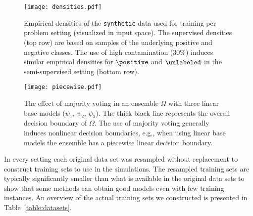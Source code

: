 \begin{figure}[!p]
  \centering
  \texttt{[image: densities.pdf]}
  \caption{Empirical densities of the \texttt{synthetic} data used for training per problem setting (visualized in input space). The supervised densities (top row) are based on samples of the underlying positive and negative classes. The use of high contamination ($30\%$) induces similar empirical densities for $\positive$ and $\unlabeled$ in the semi-supervised setting (bottom row).} %
  \label{fig:densities}
\end{figure}

\begin{figure}[!p]
  \centering
  \texttt{[image: piecewise.pdf]}
  \caption{The effect of majority voting in an ensemble $\Omega$ with three linear base models ({\color{blue!80!black}$\psi_1$}, {\color{red!80!black}$\psi_2$}, {\color{green!80!black}$\psi_3$}). The thick black line represents the overall decision boundary of $\Omega$. The use of majority voting generally induces nonlinear decision boundaries, e.g., when using linear base models the ensemble has a piecewise linear decision boundary.}
  \label{resvm:piecewise}
\end{figure}

In every setting each original data set was resampled without replacement to construct training sets to use in the simulations. The resampled training sets are typically significantly smaller than what is available in the original data sets to show that some methods can obtain good models even with few training instances. An overview of the actual training sets we constructed is presented in Table~\ref{table:datasets}. 


